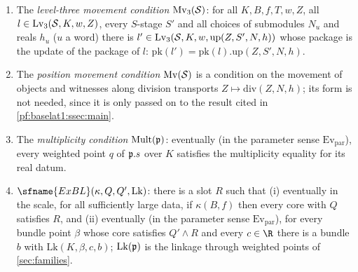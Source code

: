 \begin{definition}\label{pf:baselat1:def:cond}
\begin{enumerate}[label=(\alph*)]
\item The \emph{level-three movement condition} $\mathrm{Mv}_3(\mathcal S)$: for all $K,B,f,T,w,Z$, all
  $l\in\mathrm{Lv}_3(\mathcal S,K,w,Z)$, every $S$-stage $S'$ and all choices of submodules $N_u$ and reals
  $h_u$ ($u$ a word) there is $l'\in\mathrm{Lv}_3(\mathcal S,K,w,\mathrm{up}(Z,S',N,h))$ whose package is the
  update of the package of $l$: $\mathrm{pk}(l')=\mathrm{pk}(l).\mathrm{up}(Z,S',N,h)$.
\item The \emph{position movement condition} $\mathrm{Mv}(\mathcal S)$ is a condition on the movement of
  objects and witnesses along division transports $Z\mapsto\mathrm{div}(Z,N,h)$; its form is not needed, since
  it is only passed on to the result cited in \cref{pf:baselat1:ssec:main}.
\item The \emph{multiplicity condition} $\mathrm{Mult}(\mathfrak p)$: eventually (in the parameter sense
  $\mathrm{Ev}_{\mathrm{par}}$), every weighted point $q$ of $\mathfrak p.s$ over $K$ satisfies the multiplicity
  equality for its real datum.
\item $\sfname{ExBL}(\kappa,Q,Q',\mathrm{Lk})$: there is a slot $R$ such that (i) eventually in the scale,
  for all sufficiently large data, if $\kappa(B,f)$ then every core with $Q$ satisfies $R$, and (ii)
  eventually (in the parameter sense $\mathrm{Ev}_{\mathrm{par}}$), for every bundle point $\beta$ whose core satisfies
  $Q'\wedge R$ and every $c\in\R$ there is a bundle $b$ with $\mathrm{Lk}(K,\beta,c,b)$;
  $\mathrm{Lk}(\mathfrak p)$ is the linkage through weighted points of \cref{sec:families}.
\end{enumerate}
%
\end{definition}


